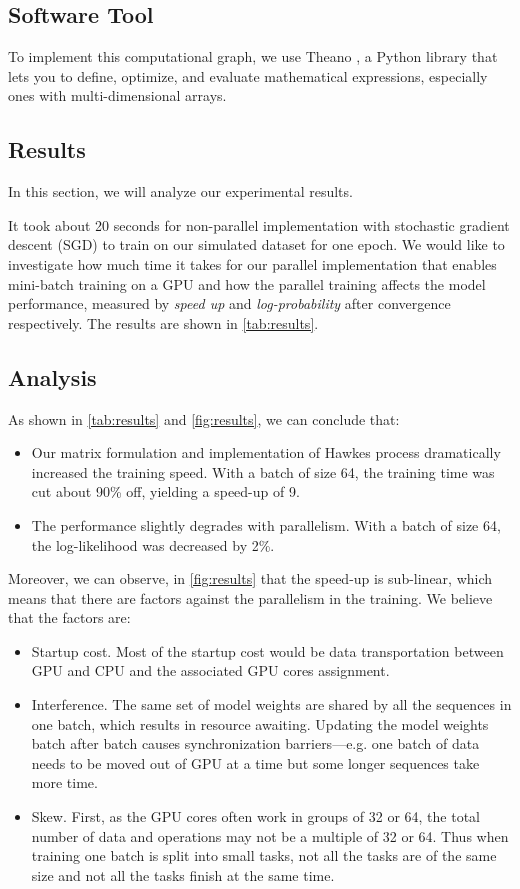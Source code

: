 \documentclass{article}
\begin{document}
\subsection{Software Tool}
To implement this computational graph, we use Theano \citep{bastien-12-theano,bergstra-10-scipy}, a Python library that lets you to define, optimize, and evaluate mathematical expressions, especially ones with multi-dimensional arrays.

\subsection{Results}
In this section, we will analyze our experimental results. 

It took about 20 seconds for non-parallel implementation with stochastic gradient descent (SGD) to train on our simulated dataset for one epoch. We would like to investigate how much time it takes for our parallel implementation that enables mini-batch training on a GPU and how the parallel training affects the model performance, measured by {\em speed up} and {\em log-probability} after convergence respectively. The results are shown in \cref{tab:results}.

\subsection{Analysis}
As shown in \cref{tab:results} and \cref{fig:results}, we can conclude that:
\begin{itemize}
\item Our matrix formulation and implementation of Hawkes process dramatically increased the training speed. With a batch of size 64, the training time was cut about 90\% off, yielding a speed-up of 9. 
\item The performance slightly degrades with parallelism. With a batch of size 64, the log-likelihood was decreased by 2\%. 
\end{itemize}

Moreover, we can observe, in \cref{fig:results} that the speed-up is sub-linear, which means that there are factors against the parallelism in the training. We believe that the factors are: 
\begin{itemize}
\item Startup cost. Most of the startup cost would be data transportation between GPU and CPU and the associated GPU cores assignment. 
\item Interference. The same set of model weights are shared by all the sequences in one batch, which results in resource awaiting. Updating the model weights batch after batch causes synchronization barriers---e.g. one batch of data needs to be moved out of GPU at a time but some longer sequences take more time. 
\item Skew. First, as the GPU cores often work in groups of 32 or 64, the total number of data and operations may not be a multiple of 32 or 64. Thus when training one batch is split into small tasks, not all the tasks are of the same size and not all the tasks finish at the same time. 
\end{itemize}
\end{document}
